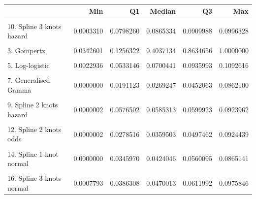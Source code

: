 \documentclass[
]{article}
\begin{document}
\begin{tabular}{lrrrrr}
\toprule
  & Min & Q1 & Median & Q3 & Max\\
\midrule
\cellcolor{gray!6}{1. Exponential} & \cellcolor{gray!6}{0.0585969} & \cellcolor{gray!6}{0.0585969} & \cellcolor{gray!6}{0.0585969} & \cellcolor{gray!6}{0.0585969} & \cellcolor{gray!6}{0.0585969}\\
10. Spline 3 knots hazard & 0.0003310 & 0.0798260 & 0.0865334 & 0.0909988 & 0.0996328\\
\cellcolor{gray!6}{2. Weibull} & \cellcolor{gray!6}{0.0039603} & \cellcolor{gray!6}{0.1641779} & \cellcolor{gray!6}{0.2507544} & \cellcolor{gray!6}{0.3170901} & \cellcolor{gray!6}{0.3714738}\\
3. Gompertz & 0.0342601 & 0.1256322 & 0.4037134 & 0.8634656 & 1.0000000\\
\cellcolor{gray!6}{4. Log-normal} & \cellcolor{gray!6}{0.0000121} & \cellcolor{gray!6}{0.0563972} & \cellcolor{gray!6}{0.0670524} & \cellcolor{gray!6}{0.0819079} & \cellcolor{gray!6}{0.0936091}\\
5. Log-logistic & 0.0022936 & 0.0533146 & 0.0700441 & 0.0935993 & 0.1092616\\
\cellcolor{gray!6}{6. Gamma} & \cellcolor{gray!6}{0.0014181} & \cellcolor{gray!6}{0.1390361} & \cellcolor{gray!6}{0.1644882} & \cellcolor{gray!6}{0.1750195} & \cellcolor{gray!6}{0.1807519}\\
7. Generalised Gamma & 0.0000000 & 0.0191123 & 0.0269247 & 0.0452063 & 0.0862100\\
\cellcolor{gray!6}{8. Spline 1 knot hazard} & \cellcolor{gray!6}{0.0000002} & \cellcolor{gray!6}{0.0592140} & \cellcolor{gray!6}{0.0598953} & \cellcolor{gray!6}{0.0610195} & \cellcolor{gray!6}{0.0916043}\\
9. Spline 2 knots hazard & 0.0000002 & 0.0576502 & 0.0585313 & 0.0599923 & 0.0923962\\
\cellcolor{gray!6}{11. Spline 1 knot odds} & \cellcolor{gray!6}{0.0000002} & \cellcolor{gray!6}{0.0281269} & \cellcolor{gray!6}{0.0363823} & \cellcolor{gray!6}{0.0502992} & \cellcolor{gray!6}{0.0917044}\\
12. Spline 2 knots odds & 0.0000002 & 0.0278516 & 0.0359503 & 0.0497462 & 0.0924439\\
\cellcolor{gray!6}{13. Spline 3 knots odds} & \cellcolor{gray!6}{0.0003253} & \cellcolor{gray!6}{0.0358147} & \cellcolor{gray!6}{0.0466608} & \cellcolor{gray!6}{0.0638606} & \cellcolor{gray!6}{0.0999099}\\
14. Spline 1 knot normal & 0.0000000 & 0.0345970 & 0.0424046 & 0.0560095 & 0.0865141\\
\cellcolor{gray!6}{15. Spline 2 knots normal} & \cellcolor{gray!6}{0.0000006} & \cellcolor{gray!6}{0.0281480} & \cellcolor{gray!6}{0.0348987} & \cellcolor{gray!6}{0.0473455} & \cellcolor{gray!6}{0.0953359}\\
16. Spline 3 knots normal & 0.0007793 & 0.0386308 & 0.0470013 & 0.0611992 & 0.0975846\\
\bottomrule
\end{tabular}
\end{document}
